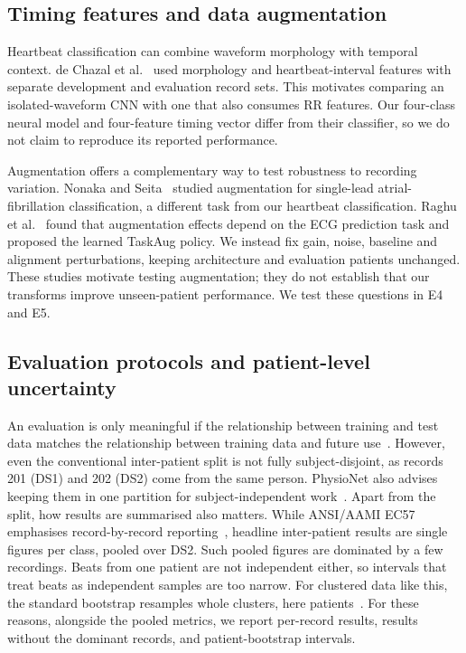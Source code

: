 \documentclass[10pt,a4paper]{article}
\begin{document}
\subsection{Timing features and data augmentation}

Heartbeat classification can combine waveform morphology with temporal context. de Chazal et al.~\cite{dechazal2004automatic} used morphology and heartbeat-interval features with separate development and evaluation record sets. This motivates comparing an isolated-waveform CNN with one that also consumes RR features. Our four-class neural model and four-feature timing vector differ from their classifier, so we do not claim to reproduce its reported performance.

Augmentation offers a complementary way to test robustness to recording variation. Nonaka and Seita~\cite{nonaka2020augmentation} studied augmentation for single-lead atrial-fibrillation classification, a different task from our heartbeat classification. Raghu et al.~\cite{raghu2022augmentation} found that augmentation effects depend on the ECG prediction task and proposed the learned TaskAug policy. We instead fix gain, noise, baseline and alignment perturbations, keeping architecture and evaluation patients unchanged. These studies motivate testing augmentation; they do not establish that our transforms improve unseen-patient performance. We test these questions in E4 and E5.

\subsection{Evaluation protocols and patient-level uncertainty}

An evaluation is only meaningful if the relationship between training and test data matches the relationship between training data and future use~\cite{Saeb2017}. However, even the conventional inter-patient split is not fully subject-disjoint, as records 201 (DS1) and 202 (DS2) come from the same person. PhysioNet also advises keeping them in one partition for subject-independent work~\cite{moody2005mitbih}. Apart from the split, how results are summarised also matters. While ANSI/AAMI EC57 emphasises record-by-record reporting~\cite{AAMI2012}, headline inter-patient results are single figures per class, pooled over DS2. Such pooled figures are dominated by a few recordings. Beats from one patient are not independent either, so intervals that treat beats as independent samples are too narrow. For clustered data like this, the standard bootstrap resamples whole clusters, here patients~\cite{Field2007,Davison1997,Efron1993}. For these reasons, alongside the pooled metrics, we report per-record results, results without the dominant records, and patient-bootstrap intervals.
\end{document}

